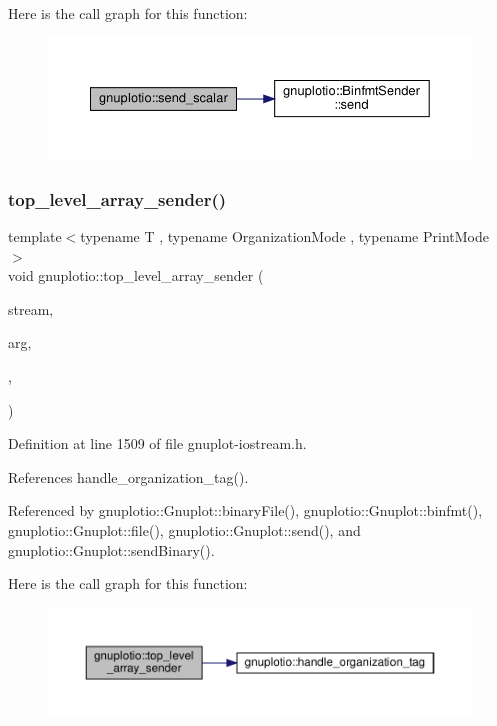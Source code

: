 Here is the call graph for this function\+:\nopagebreak
\begin{figure}[H]
\begin{center}
\leavevmode
\includegraphics[width=350pt]{namespacegnuplotio_a926e0935a02d83735da2c34cfbad133f_cgraph}
\end{center}
\end{figure}
\mbox{\label{namespacegnuplotio_a1e452d861932700749421ce103ef8d48}} 
\subsubsection{\texorpdfstring{top\+\_\+level\+\_\+array\+\_\+sender()}{top\_level\_array\_sender()}}
{\footnotesize\ttfamily template$<$typename T , typename Organization\+Mode , typename Print\+Mode $>$ \\
void gnuplotio\+::top\+\_\+level\+\_\+array\+\_\+sender (\begin{DoxyParamCaption}\item[{std\+::ostream \&}]{stream,  }\item[{const T \&}]{arg,  }\item[{Organization\+Mode}]{,  }\item[{Print\+Mode}]{ }\end{DoxyParamCaption})}



Definition at line 1509 of file gnuplot-\/iostream.\+h.



References handle\+\_\+organization\+\_\+tag().



Referenced by gnuplotio\+::\+Gnuplot\+::binary\+File(), gnuplotio\+::\+Gnuplot\+::binfmt(), gnuplotio\+::\+Gnuplot\+::file(), gnuplotio\+::\+Gnuplot\+::send(), and gnuplotio\+::\+Gnuplot\+::send\+Binary().

Here is the call graph for this function\+:\nopagebreak
\begin{figure}[H]
\begin{center}
\leavevmode
\includegraphics[width=350pt]{namespacegnuplotio_a1e452d861932700749421ce103ef8d48_cgraph}
\end{center}
\end{figure}
